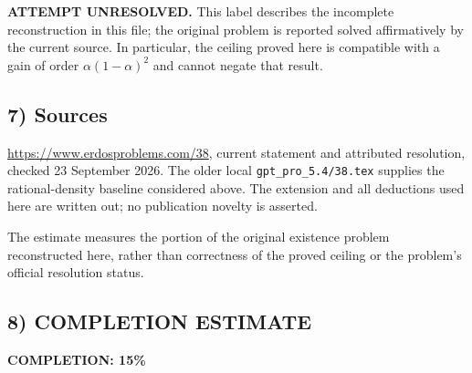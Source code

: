 \textbf{ATTEMPT UNRESOLVED.} This label describes the incomplete reconstruction in this file; the original problem is reported solved affirmatively by the current source. In particular, the ceiling proved here is compatible with a gain of order $\alpha(1-\alpha)^2$ and cannot negate that result.

\subsection*{7) Sources}
\url{https://www.erdosproblems.com/38}, current statement and attributed resolution, checked 23 September 2026. The older local \texttt{gpt\_pro\_5.4/38.tex} supplies the rational-density baseline considered above. The extension and all deductions used here are written out; no publication novelty is asserted.

The estimate measures the portion of the original existence problem reconstructed here, rather than correctness of the proved ceiling or the problem's official resolution status.
\subsection*{8) COMPLETION ESTIMATE}
\textbf{COMPLETION: 15\%}
